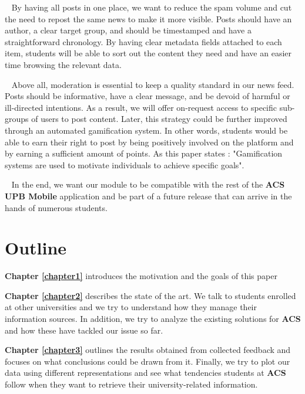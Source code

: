 ~
By having all posts in one place, we want to reduce the spam volume and cut the need to repost the same news to make it more visible. Posts should have an author, a clear target group, and should be timestamped and have a straightforward chronology. By having clear metadata fields attached to each item, students will be able to sort out the content they need and have an easier time browsing the relevant data. 


~
Above all, moderation is essential to keep a quality standard in our news feed. Posts should be informative, have a clear message, and be devoid of harmful or ill-directed intentions. As a result, we will offer on-request access to specific sub-groups of users to post content. Later, this strategy could be further improved through an automated gamification system. In other words, students would be able to earn their right to post by being positively involved on the platform and by earning a sufficient amount of points. As this paper states \cite{gamified-systems-paper}: "Gamification systems are used to motivate individuals to achieve specific goals".

~
In the end, we want our module to be compatible with the rest of the \textbf{ACS UPB Mobile} application and be part of a future release that can arrive in the hands of numerous students.

\section{Outline} \label{1:outline}

    \textbf{Chapter \ref{chapter1}} introduces the motivation and the goals of this paper
    
    \textbf{Chapter \ref{chapter2}} describes the state of the art. We talk to students enrolled at other universities and we try to understand how they manage their information sources. In addition, we try to analyze the existing solutions for \textbf{ACS} and how these have tackled our issue so far.
    
    \textbf{Chapter \ref{chapter3}} outlines the results obtained from collected feedback and focuses on what conclusions could be drawn from it. Finally, we try to plot our data using different representations and see what tendencies students at \textbf{ACS} follow when they want to retrieve their university-related information.
    
